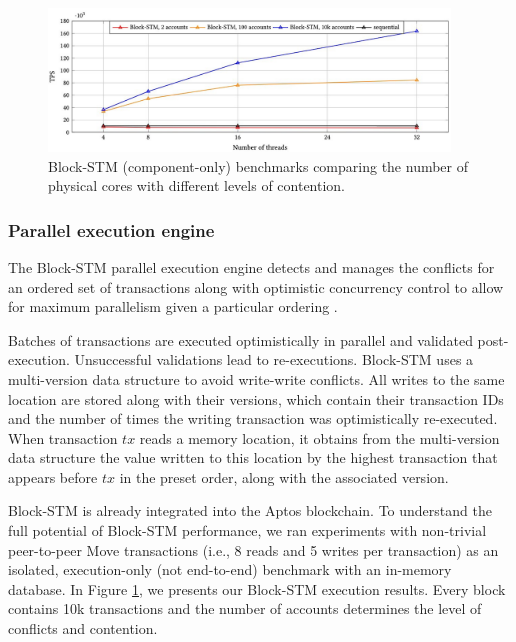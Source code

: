 \documentclass{article}
\begin{document}
\begin{figure}
\centering
\includegraphics[width=0.95\textwidth]{perf.jpg}
\caption{\label{fig:perf}Block-STM (component-only) benchmarks comparing the number of physical cores with different levels of contention.}
\end{figure}

\subsubsection{Parallel execution engine}

The Block-STM parallel execution engine detects and manages the conflicts for an ordered set of transactions along with optimistic concurrency control to allow for maximum parallelism given a particular ordering \cite{block_stm}.

Batches of transactions are executed optimistically in parallel and validated post-execution. Unsuccessful validations lead to re-executions. Block-STM uses a multi-version data structure to avoid write-write conflicts. All writes to the same location are stored along with their versions, which contain their transaction IDs and the number of times the writing transaction was optimistically re-executed. When transaction $tx$ reads a memory location, it obtains from the multi-version data structure the value written to this location by the highest transaction that appears before $tx$ in the preset order, along with the associated version. 

Block-STM is already integrated into the Aptos blockchain. To understand the full potential of Block-STM performance, we ran experiments with non-trivial peer-to-peer Move transactions (i.e., 8 reads and 5 writes per transaction) as an isolated, execution-only (not end-to-end) benchmark with an in-memory database. In Figure \ref{fig:perf}, we presents our Block-STM execution results. Every block contains 10k transactions and the number of accounts determines the level of conflicts and contention.
\end{document}

